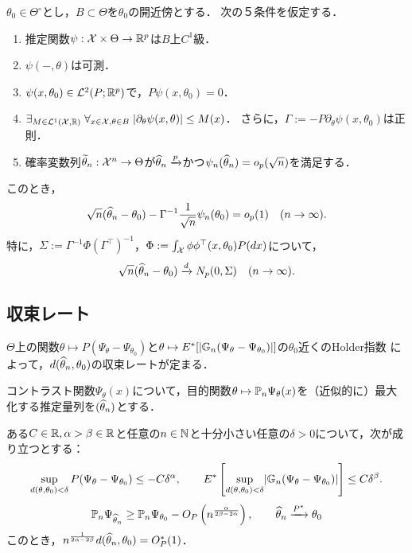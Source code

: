 \documentclass[uplatex,dvipdfmx]{jsreport}
\begin{document}
\begin{theorem}[漸近正規性の十分条件]\label{thm-asymptotic-normality}
    $\theta_0\in\Theta^\circ$とし，$B\subset\Theta$を$\theta_0$の開近傍とする．
    次の５条件を仮定する．
    \begin{enumerate}[({E}1)]
        \item 推定関数$\psi:\mathcal{X}\times\Theta\to\mathbb{R}^p$は$B$上$C^1$級．
        \item $\psi(-,\theta)$は可測．
        \item $\psi(x,\theta_0)\in\mathcal{L}^2(P;\mathbb{R}^p)$で，$P\psi(x,\theta_0)=0$．
        \item $\exists_{M\in\mathcal{L}^1(\mathcal{X},\mathbb{R})}\;\forall_{x\in\mathcal{X},\theta\in B}\;\lvert\partial_\theta\psi(x,\theta)\rvert\leq M(x)$．
        さらに，$\Gamma:=-P\partial_\theta\psi(x,\theta_0)$は正則．
        \item 確率変数列$\widetilde{\theta}_n:\mathcal{X}^n\to\Theta$が$\widehat{\theta}_n\xrightarrow{p}$かつ$\psi_n(\widehat{\theta}_n)=o_p(\sqrt{n})$を満足する．
    \end{enumerate}
    このとき，
    \[\sqrt{n}(\widehat{\theta}_n-\theta_0)-\Gamma^{-1}\frac{1}{\sqrt{n}}\psi_n(\theta_0)=o_p(1)\quad(n\to\infty).\]
    特に，$\Sigma:=\Gamma^{-1}\Phi(\Gamma^{\top})^{-1}$，$\Phi:=\int_{\mathcal{X}}\phi\phi^{\top}(x,\theta_0)P(dx)$について，
    \[\sqrt{n}(\widehat{\theta}_n-\theta_0)\xrightarrow{d}N_p(0,\Sigma)\quad(n\to\infty).\]
\end{theorem}

\subsection{収束レート}

\begin{tcolorbox}[colframe=ForestGreen, colback=ForestGreen!10!white,breakable,colbacktitle=ForestGreen!40!white,coltitle=black,fonttitle=\bfseries\sffamily,
title=]
    $\Theta$上の関数$\theta\mapsto P(\Psi_\theta-\Psi_{\theta_0})$と$\theta\mapsto E^*[\lvert\mathbb{G}_n(\Psi_\theta-\Psi_{\theta_0})\rvert]$の$\theta_0$近くのHolder指数
    によって，$d(\widehat{\theta}_n,\theta_0)$の収束レートが定まる．
\end{tcolorbox}

\begin{notation}
    コントラスト関数$\Psi_\theta(x)$について，目的関数$\theta\mapsto\mathbb{P}_n\Psi_\theta(x)$を（近似的に）最大化する推定量列を$(\widehat{\theta}_n)$とする．
\end{notation}

\begin{theorem}
    ある$C\in\mathbb{R},\alpha>\beta\in\mathbb{R}$と任意の$n\in\mathbb{N}$と十分小さい任意の$\delta>0$について，次が成り立つとする：
    \[\sup_{d(\theta,\theta_0)<\delta}P(\Psi_\theta-\Psi_{\theta_0})\le-C\delta^\alpha,\qquad E^*\left[\sup_{d(\theta,\theta_0)<\delta}\lvert\mathbb{G}_n(\Psi_\theta-\Psi_{\theta_0})\rvert\right]\le C\delta^\beta.\]
    \[\mathbb{P}_n\Psi_{\widehat{\theta}_n}\ge\mathbb{P}_n\Psi_{\theta_0}-O_P\left(n^{\frac{\alpha}{2\beta-2\alpha}}\right),\qquad\widehat{\theta}_n\xrightarrow{P^*}\theta_0\]
    このとき，$n^{\frac{1}{2\alpha-2\beta}}d(\widehat{\theta}_n,\theta_0)=O^*_P(1)$．
\end{theorem}
\end{document}
